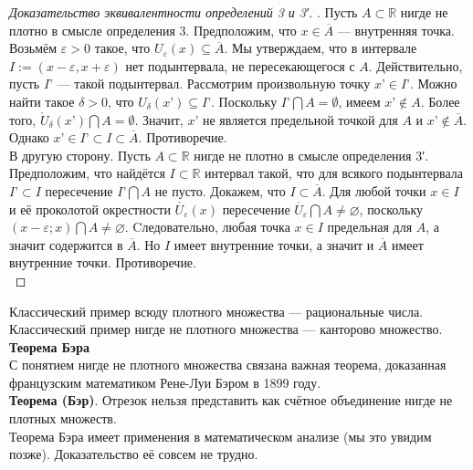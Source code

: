 \documentclass{report}
\begin{document}
\begin{proof}[Доказательство эквивалентности определений 3 и 3′]. Пусть $A \subset \mathbb{R}$ нигде не плотно в смысле определения 3. Предположим, что $x \in \overline{A}$ — внутренняя точка. Возьмём $\varepsilon>0$ такое, что $U_{\varepsilon}(x) \subseteq \overline{A}$. Мы утверждаем, что в интервале $I:= (x-\varepsilon, x+\varepsilon)$ нет подынтервала, не пересекающегося с $A$. Действительно, пусть $I’$ — такой подынтервал. Рассмотрим произвольную точку $x’ \in I’$. Можно найти такое $\delta>0$, что $U_{\delta}(x’) \subseteq I’$. Поскольку $I’ \bigcap A = \emptyset$, имеем $x’ \notin A$. Более того, $\mathring{U}_{\delta}(x’) \bigcap A = \emptyset$. Значит, $x’$ не является предельной точкой для $A$ и $x’ \notin \overline{A}$. Однако $x’ \in I’ \subset I \subset \overline{A}$. Противоречие. \\

В другую сторону. Пусть $A \subset \mathbb{R}$ нигде не плотно в смысле определения 3′. Предположим, что найдётся $I \subset \mathbb{R}$ интервал такой, что для всякого подынтервала $I’ \subset I$ пересечение $I’ \bigcap A$ не пусто. Докажем, что $I \subset \overline{A}$. Для любой точки $x \in I$ и её проколотой окрестности $\mathring{U_{\varepsilon}}(x)$ пересечение $\mathring{U_{\varepsilon}} \bigcap A \neq \varnothing$, поскольку $(x-\varepsilon; x) \bigcap A \neq \varnothing$. Cледовательно, любая точка $x \in I$ предельная для $A$, а значит содержится в $\overline{A}$. Но $I$ имеет внутренние точки, а значит и $\overline{A}$ имеет внутренние точки. Противоречие.\\
\end{proof}

Классический пример всюду плотного множества — рациональные числа. Классический пример нигде не плотного множества — канторово множество. \\

\textbf{Теорема Бэра}\\
С понятием нигде не плотного множества связана важная теорема, доказанная французским математиком Рене-Луи Бэром в 1899 году. \\

\textbf{Теорема (Бэр)}. Отрезок нельзя представить как счётное объединение нигде не плотных множеств. \\

Теорема Бэра имеет применения в математическом анализе (мы это увидим позже). Доказательство её совсем не трудно. \\
\end{document}

